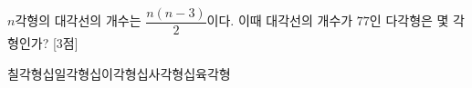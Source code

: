 $n$각형의 대각선의 개수는 $\dfrac{n(n-3)}{2}$이다. 이때 대각선의 개수가 $77$인 다각형은 몇 각형인가? \mbox{[3점]}
\begin{choices32}{칠각형}{십일각형}{십이각형}{십사각형}{십육각형}\end{choices32}
